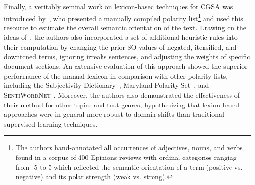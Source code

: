 Finally, a veritably seminal work on lexicon-based techniques for CGSA
was introduced by~\citet{Taboada:11}, who presented a manually
compiled polarity list\footnote{The authors hand-annotated all
  occurrences of adjectives, nouns, and verbs found in a corpus of 400
  Epinions reviews with ordinal categories ranging from -5 to 5 which
  reflected the semantic orientation of a term (positive vs. negative)
  and its polar strength (weak vs. strong).} and used this resource to
estimate the overall semantic orientation of the text.  Drawing on the
ideas of~\citet{Polanyi:06}, the authors also incorporated a set of
additional heuristic rules into their computation by changing the
prior SO values of negated, itensified, and downtoned terms, ignoring
irrealis sentences, and adjusting the weights of specific document
sections.  An extensive evaluation of this approach showed the
superior performance of the manual lexicon in comparison with other
polarity lists, including the Subjectivity
Dictionary~\cite{Wilson:05}, Maryland Polarity Set~\cite{Mohammad:09},
and \textsc{SentiWordNet}~\cite{Esuli:06c}.  Moreover, the authors
also demonstrated the effectiveness of their method for other topics
and text genres, hypothesizing that lexion-based approaches were in
general more robust to domain shifts than traditional supervised
learning techniques.


